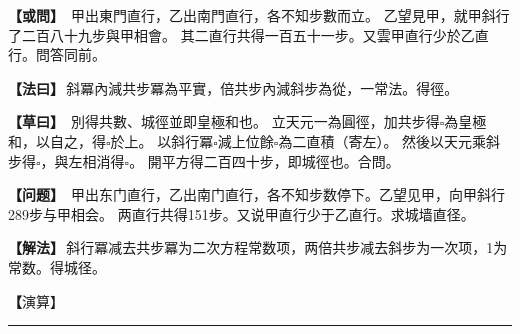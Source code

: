 \documentclass[11pt,a4paper]{article}
\let\origsquare\square
\renewcommand{\square}{\ensuremath{\origsquare}}%
\newcommand{\longline}{\noindent\rule{\textwidth}{0.4pt}}
\newcommand{\clOWEN}[1]{%
  \par\vspace{0.3em}%
  \noindent\textcolor{problemcolor}{\textbf{【或問】}}\,{\tradfont #1}\par\nopagebreak%
}
\newcommand{\mdOWEN}[1]{%
  \par\vspace{0.3em}%
  \noindent\textcolor{problemcolor}{\textbf{【问题】}}\,{\modfont #1}\par\nopagebreak%
}
\newcommand{\clFAYUE}[1]{%
  \par\noindent\textcolor{methodcolor}{\textbf{【法曰】}}\,{\tradfont #1}\par\nopagebreak%
}
\newcommand{\mdFAYUE}[1]{%
  \par\noindent\textcolor{methodcolor}{\textbf{【解法】}}\,{\modfont #1}\par\nopagebreak%
}
\newcommand{\clTSAOYUE}[1]{%
  \par\noindent\textcolor{workcolor}{\textbf{【草曰】}}\,{\tradfont #1}\par%
}
\newcommand{\mdTSAOYUE}[1]{%
  \par\noindent\textcolor{workcolor}{\textbf【演算】}}\,{\modfont #1}\par%
\begin{document}
\begin{paracol}{2}

\begin{leftcolumn}
\clOWEN{%
甲出東門直行，乙出南門直行，各不知步數而立。
乙望見甲，就甲斜行了二百八十九步與甲相會。
其二直行共得一百五十一步。又雲甲直行少於乙直行。問答同前。}

\clFAYUE{斜冪內減共步冪為平實，倍共步內減斜步為從，一常法。得徑。}

\clTSAOYUE{%
別得共數、城徑並即皇極和也。
立天元一為圓徑，加共步得$\square$為皇極和，以自之，得$\square$於上。
以斜行冪$\square$減上位餘$\square$為二直積（寄左）。
然後以天元乘斜步得$\square$，與左相消得$\square$。
開平方得二百四十步，即城徑也。合問。}
\end{leftcolumn}

\switchcolumn

\begin{rightcolumn}
\mdOWEN{%
甲出东门直行，乙出南门直行，各不知步数停下。乙望见甲，向甲斜行289步与甲相会。
两直行共得151步。又说甲直行少于乙直行。求城墙直径。}

\mdFAYUE{斜行冪减去共步冪为二次方程常数项，两倍共步减去斜步为一次项，1为常数。得城径。}

\mdTSAOYUE{%
辨识得：共数与城径之和即皇极和。
设天元一为圆径，加共步得$\square$为皇极和，自乘得$\square$于上位。
以斜行冪$\square$减上位余$\square$为两倍直积（寄左）。
然后天元乘斜步得$\square$，与左式相消得$\square$。
开平方得240步，即城径。符合所问。}
\end{rightcolumn}

\end{paracol}

\vspace{0.3cm}
\begin{center}\longline\end{center}
\end{document}
